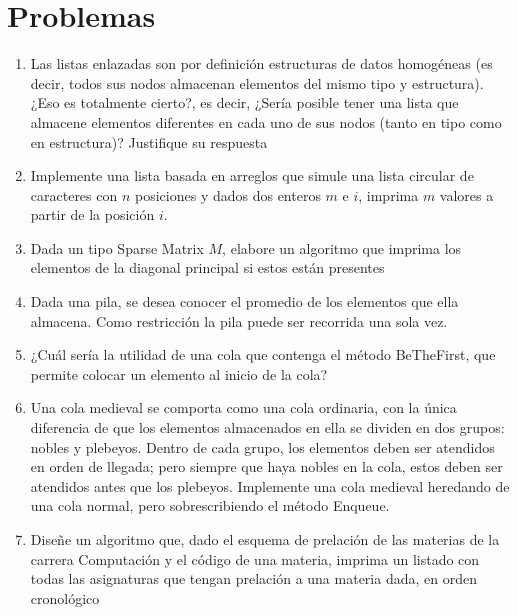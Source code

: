\section{Problemas}

\begin{enumerate}
\item Las listas enlazadas son por definición estructuras de datos homogéneas (es decir, todos sus nodos almacenan elementos del mismo tipo y estructura). ¿Eso es totalmente cierto?, es decir, ¿Sería posible tener una lista que almacene elementos diferentes en cada uno de sus nodos (tanto en tipo como en estructura)? Justifique su respuesta
\item Implemente una lista basada en arreglos que simule una lista circular de caracteres con $n$ posiciones y dados dos enteros $m$ e $i$, imprima $m$ valores a partir de la posición $i$. 
\item Dada un tipo Sparse Matrix $M$, elabore un algoritmo que imprima los elementos de la diagonal principal si estos están presentes
\item Dada una pila, se desea conocer el promedio de los elementos que ella almacena. Como restricción la pila puede ser recorrida una sola vez.
\item ¿Cuál sería la utilidad de una cola que contenga el método BeTheFirst, que permite colocar un elemento al inicio de la cola?
\item Una cola medieval se comporta como una cola ordinaria, con la única diferencia de que los elementos almacenados en ella se dividen en dos grupos: nobles y plebeyos. Dentro de cada grupo, los elementos deben ser atendidos en orden de llegada; pero siempre que haya nobles en la cola, estos deben ser atendidos antes que los plebeyos. Implemente una cola medieval heredando de una cola normal, pero sobrescribiendo el método Enqueue.
\item Diseñe un algoritmo que, dado el esquema de prelación de las materias de la carrera Computación y el código de una materia, imprima un listado con todas las asignaturas que tengan prelación a una materia dada, en orden cronológico
\end{enumerate}